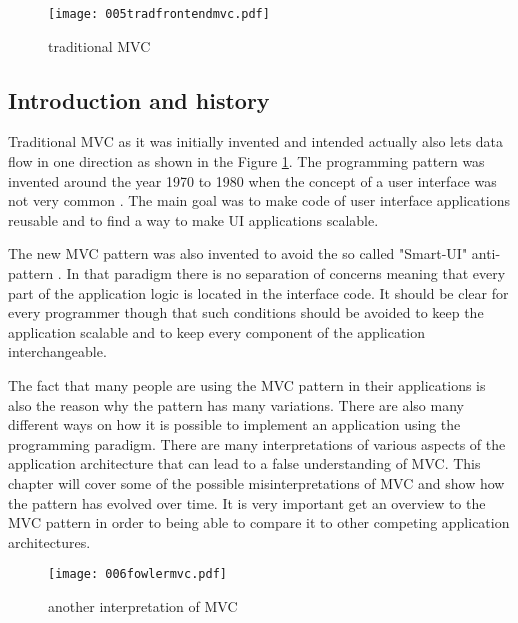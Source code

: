 \begin{figure}
  \centering
  \texttt{[image: 005tradfrontendmvc.pdf]}
  \caption{traditional MVC \cite[interpreted from][1.3 Traditional MVC]{stefanoborini.2014}}
  \label{fig:tradmvc}
\end{figure}

\subsection{Introduction and history}

Traditional MVC as it was initially invented and intended actually also lets data flow in one direction as shown in the Figure \ref{fig:tradmvc}. The programming pattern was invented around the year 1970 to 1980 when the concept of a user interface was not very common \cite[\#ModelViewController]{MartinFowler.2006}. The main goal was to make code of user interface applications reusable and to find a way to make UI applications scalable.

The new MVC pattern was also invented to avoid the so called "Smart-UI" anti-pattern \cite[S.11,S.13]{MattiBragge.2013}. In that paradigm there is no separation of concerns meaning that every part of the application logic is located in the interface code. It should be clear for every programmer though that such conditions should be avoided to keep the application scalable and to keep every component of the application interchangeable.


The fact that many people are using the MVC pattern in their applications is also the reason why the pattern has many variations. There are also many different ways on how it is possible to implement an application using the programming paradigm. There are many interpretations of various aspects of the application architecture that can lead to a false understanding of MVC. This chapter will cover some of the possible misinterpretations of MVC and show how the pattern has evolved over time. It is very important get an overview to the MVC pattern in order to being able to compare it to other competing application architectures.

\begin{figure}
  \centering
  \texttt{[image: 006fowlermvc.pdf]}
  \caption{another interpretation of MVC \cite[seen by][\#ModelViewController]{MartinFowler.2006}}
  \label{fig:fowlermvc}
\end{figure}

